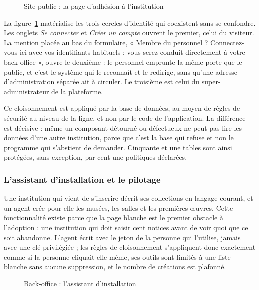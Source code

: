 \begin{figure}[!ht]
\centering
{}
\caption{Site public : la page d'adhésion à l'institution}
\label{fig:cap-adhesion}
\end{figure}

La figure~\ref{fig:cap-adhesion} matérialise les trois cercles d'identité qui
coexistent sans se confondre. Les onglets \emph{Se connecter} et \emph{Créer un
compte} ouvrent le premier, celui du visiteur. La mention placée au bas du
formulaire, « Membre du personnel ? Connectez-vous ici avec vos identifiants
habituels : vous serez conduit directement à votre back-office », ouvre le
deuxième : le personnel emprunte la même porte que le public, et c'est le
système qui le reconnaît et le redirige, sans qu'une adresse d'administration
séparée ait à circuler. Le troisième est celui du super-administrateur de la
plateforme.

Ce cloisonnement est appliqué par la base de données, au moyen de règles de
sécurité au niveau de la ligne, et non par le code de l'application. La
différence est décisive : même un composant détourné ou défectueux ne peut pas
lire les données d'une autre institution, parce que c'est la base qui refuse et
non le programme qui s'abstient de demander. Cinquante et une tables sont ainsi
protégées, sans exception, par cent une politiques déclarées.

\subsubsection{L'assistant d'installation et le pilotage}

Une institution qui vient de s'inscrire décrit ses collections en langage
courant, et un agent crée pour elle les musées, les salles et les premières
œuvres. Cette fonctionnalité existe parce que la page blanche est le premier
obstacle à l'adoption : une institution qui doit saisir cent notices avant de
voir quoi que ce soit abandonne. L'agent écrit avec le jeton de la personne qui
l'utilise, jamais avec une clé privilégiée ; les règles de cloisonnement
s'appliquent donc exactement comme si la personne cliquait elle-même, ses outils
sont limités à une liste blanche sans aucune suppression, et le nombre de
créations est plafonné.

\begin{figure}[!ht]
\centering
{}
\caption{Back-office : l'assistant d'installation}
\label{fig:cap-setup}
\end{figure}


